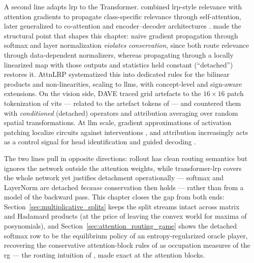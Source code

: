 A second line adapts \ac{lrp} \parencite{Bach2015} to the Transformer. \textcite{Chefer2021ICCV} combined \ac{lrp}-style relevance with attention gradients to propagate class-specific relevance through self-attention, later generalized to co-attention and encoder--decoder architectures \parencite{Chefer2021GenericAttention}. \textcite{Ali2022AttnLRP} made the structural point that shapes this chapter: naive gradient propagation through softmax and layer normalization \emph{violates conservation}, since both route relevance through data-dependent normalizers, whereas propagating through a locally linearized map with those outputs and statistics held constant (``detached'') restores it. AttnLRP \parencite{Achtibat2024AttnLRP} systematized this into dedicated rules for the bilinear products and non-linearities, scaling to \acp{llm}, with concept-level \parencite{Achtibat2023CRP} and sign-aware \parencite{vukadin2024abslrp} extensions. On the vision side, DAVE \parencite{Wrobel2024} traced grid artefacts to the $16{\times}16$ patch tokenization of \acp{vit} \parencite{Dosovitskiy2021vit} --- related to the artefact tokens of \textcite{darcet2024vision} --- and countered them with \emph{conditioned} (detached) operators and attribution averaging over random spatial transformations. At \ac{llm} scale, gradient approximations of activation patching \parencite{Syed2024AttributionPatching,Kramar2024AtPStar} localize circuits against interventions \parencite{Hanna2024Faithfulness}, and attribution increasingly acts as a control signal for head identification and guided decoding \parencite{Kahardipraja2025Atlas,Komorowski2026AGD}.

The two lines pull in opposite directions: rollout has clean routing semantics but ignores the network outside the attention weights, while transformer-\ac{lrp} covers the whole network yet justifies detachment operationally --- softmax and LayerNorm are detached \emph{because} conservation then holds --- rather than from a model of the backward pass. This chapter closes the gap from both ends: Section~\ref{sec:multiplicative_splits} keeps the split streams intact across matrix and Hadamard products (at the price of leaving the convex world for maxima of posynomials), and Section~\ref{sec:attention_routing_game} shows the detached softmax row to be the equilibrium policy of an entropy-regularized oracle player, recovering the conservative attention-block rules of \textcite{Ali2022AttnLRP} as occupation measures of the \ac{rg} --- the routing intuition of \textcite{Abnar2020attention}, made exact at the attention blocks.

